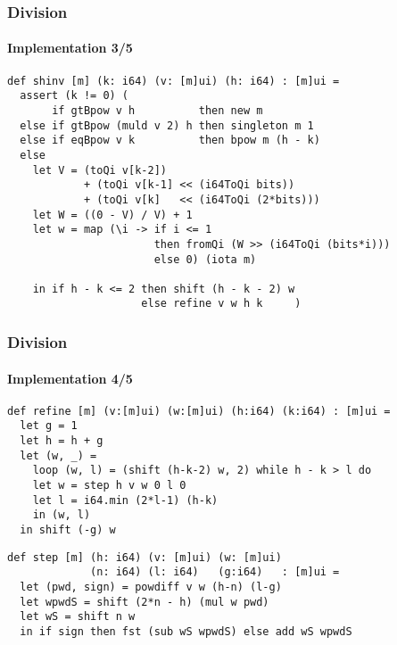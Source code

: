 \begin{frame}[fragile]
  \frametitle{Division}
  \framesubtitle{Implementation 3/5}
\begin{lstlisting}[language=futhark,basicstyle=\scriptsize,escapeinside=@@,firstnumber=18,frame=single]
def shinv [m] (k: i64) (v: [m]ui) (h: i64) : [m]ui =
  assert (k != 0) (
       if gtBpow v h          then new m
  else if gtBpow (muld v 2) h then singleton m 1
  else if eqBpow v k          then bpow m (h - k)
  else
    let V = (toQi v[k-2])
            + (toQi v[k-1] << (i64ToQi bits))
            + (toQi v[k]   << (i64ToQi (2*bits)))
    let W = ((0 - V) / V) + 1
    let w = map (\i -> if i <= 1
                       then fromQi (W >> (i64ToQi (bits*i)))
                       else 0) (iota m)

    in if h - k <= 2 then shift (h - k - 2) w
                     else refine v w h k     )
\end{lstlisting}
\end{frame}

\begin{frame}[fragile]
  \frametitle{Division}
  \framesubtitle{Implementation 4/5}
\begin{lstlisting}[language=futhark,basicstyle=\scriptsize,escapeinside=@@,firstnumber=34,frame=single]
def refine [m] (v:[m]ui) (w:[m]ui) (h:i64) (k:i64) : [m]ui =
  let g = 1
  let h = h + g
  let (w, _) =
    loop (w, l) = (shift (h-k-2) w, 2) while h - k > l do
    let w = step h v w 0 l 0
    let l = i64.min (2*l-1) (h-k)
    in (w, l)
  in shift (-g) w
\end{lstlisting}\vspace*{0.5em}

\begin{lstlisting}[language=futhark,basicstyle=\scriptsize,escapeinside=@@,firstnumber=43,frame=single]
def step [m] (h: i64) (v: [m]ui) (w: [m]ui)
             (n: i64) (l: i64)   (g:i64)   : [m]ui =
  let (pwd, sign) = powdiff v w (h-n) (l-g)
  let wpwdS = shift (2*n - h) (mul w pwd)
  let wS = shift n w
  in if sign then fst (sub wS wpwdS) else add wS wpwdS
\end{lstlisting}
\end{frame}

